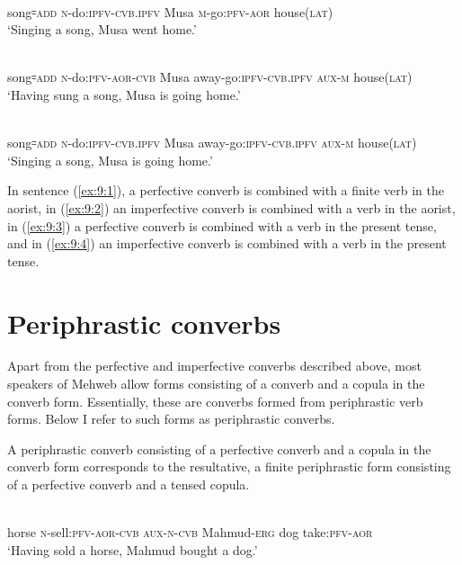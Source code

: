 ﻿\documentclass[output=paper]{langsci/langscibook}
\begin{document}
\ex \label{ex:9:2} %
\\
song꞊\textsc{add} \textsc{n}-do:\textsc{ipfv}-\textsc{cvb.ipfv} Musa \textsc{m}-go:\textsc{pfv}-\textsc{aor} house(\textsc{lat})\\
\glt `Singing a song, Musa went home.'

\ex \label{ex:9:3} %
\\
song꞊\textsc{add} \textsc{n}-do:\textsc{pfv}-\textsc{aor}-\textsc{cvb} Musa away-go:\textsc{ipfv}-\textsc{cvb.ipfv} \textsc{aux}-\textsc{m} house(\textsc{lat})\\
\glt `Having sung a song, Musa is going home.'

\ex \label{ex:9:4} %
\\
song꞊\textsc{add} \textsc{n}-do:\textsc{ipfv}-\textsc{cvb.ipfv} Musa away-go:\textsc{ipfv}-\textsc{cvb.ipfv} \textsc{aux}-\textsc{m} house(\textsc{lat})\\
\glt `Singing a song, Musa is going home.'
\z

In sentence (\ref{ex:9:1}), a perfective converb is combined with a finite verb in
the aorist, in (\ref{ex:9:2}) an imperfective converb is combined with a verb in
the aorist, in (\ref{ex:9:3}) a perfective converb is combined with a verb in the present
tense, and in (\ref{ex:9:4}) an imperfective converb is combined with a verb in the
present tense.

\section{Periphrastic converbs}\label{periphrastic-converbs}


Apart from the perfective and imperfective converbs described above,
most speakers of Mehweb allow forms consisting of a converb and a copula
in the converb form. Essentially, these are converbs formed from
periphrastic verb forms. Below I refer to such forms as periphrastic
converbs.

A periphrastic converb consisting of a perfective converb and a
copula in the converb form corresponds to the resultative, a finite
periphrastic form consisting of a perfective converb and a tensed copula.


\ea \label{ex:9:5} %
\\
horse \textsc{n}-sell:\textsc{pfv}-\textsc{aor}-\textsc{cvb} \textsc{aux}-\textsc{n}-\textsc{cvb} Mahmud-\textsc{erg} dog take:\textsc{pfv}-\textsc{aor}\\
\glt `Having sold a horse, Mahmud bought a dog.'
\z
\end{document}
